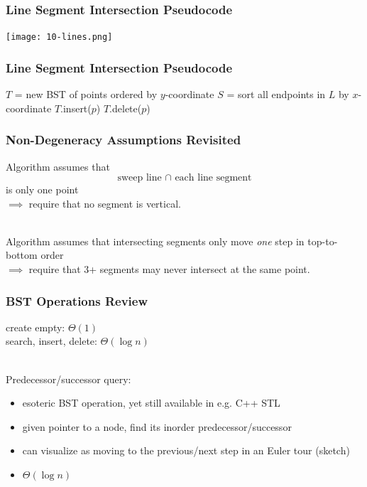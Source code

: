 \documentclass{beamer}
\newcommand{\stanza}{ \\~\ }
\begin{document}
\begin{frame} \frametitle{Line Segment Intersection Pseudocode}
\texttt{[image: 10-lines.png]}
\end{frame}

\begin{frame} \frametitle{Line Segment Intersection Pseudocode}
  {\footnotesize
  \begin{algorithmic}[1]
      \State $T$ = new BST of points ordered by $y$-coordinate
      \State $S$ = sort all endpoints in $L$ by $x$-coordinate
          \State $T$.insert($p$)
            \State {}
          \EndIf
        \Else {}
            \State {}
          \EndIf
          \State $T$.delete($p$)
        \EndIf
      \EndFor
      \State {}
    \EndFunction
  \end{algorithmic}
  }
\end{frame}

\begin{frame} \frametitle{Non-Degeneracy Assumptions Revisited}
Algorithm assumes that
\[ \text{sweep line } \cap \text{ each line segment} \]
is only one point \\
$\implies$ require that no segment is vertical. \stanza

Algorithm assumes that intersecting segments only move \emph{one} step
in top-to-bottom order \\
$\implies$ require that 3+ segments may never intersect at the same point.
\end{frame}

\begin{frame} \frametitle{BST Operations Review}
create empty: $\Theta(1)$ \\
search, insert, delete: $\Theta(\log n)$ \stanza

Predecessor/successor query:
\begin{itemize}
  \item esoteric BST operation, yet still available in e.g. C++ STL
  \item given pointer to a node, find its inorder predecessor/successor
  \item can visualize as moving to the previous/next step in an Euler tour
    (sketch)
  \item $\Theta(\log n)$
\end{itemize}
\end{frame}
\end{document}
